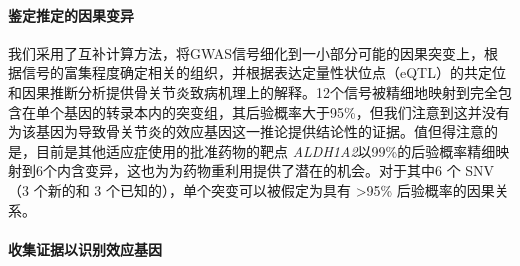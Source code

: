 \paragraph*{鉴定推定的因果变异}
我们采用了互补计算方法，将GWAS信号细化到一小部分可能的因果突变上，根据信号的富集程度确定相关的组织，并根据表达定量性状位点（eQTL）的共定位和因果推断分析提供骨关节炎致病机理上的解释。12个信号被精细地映射到完全包含在单个基因的转录本内的突变组，其后验概率大于95\%，但我们注意到这并没有为该基因为导致骨关节炎的效应基因这一推论提供结论性的证据。值但得注意的是，目前是其他适应症使用的批准药物的靶点\emph{
ALDH1A2}以99\%的后验概率精细映射到6个内含变异，这也为为药物重利用提供了潜在的机会。对于其中6
个 SNV（3 个新的和 3 个已知的），单个突变可以被假定为具有
\textgreater95\% 后验概率的因果关系。

\paragraph*{收集证据以识别效应基因}

